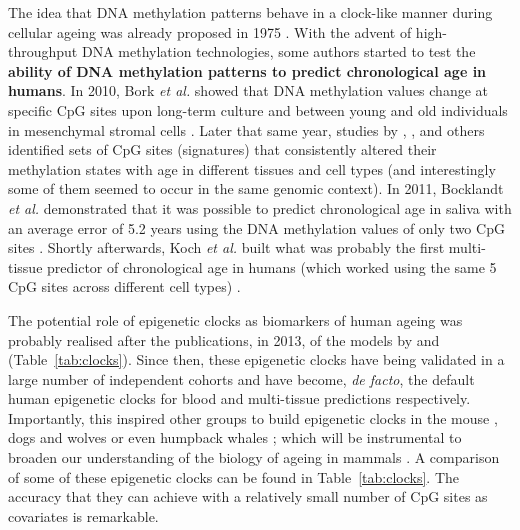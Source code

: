 \bigskip

The idea that DNA methylation patterns behave in a clock-like manner during cellular ageing was already proposed in 1975 \citep{Holliday1975}. With the advent of high-throughput DNA methylation technologies, some authors started to test the \textbf{ability of DNA methylation patterns to predict chronological age in humans}. In 2010, Bork \textit{et al.} showed that DNA methylation values change at specific CpG sites upon long-term culture and between young and old individuals in mesenchymal stromal cells \citep{Bork2010}. Later that same year, studies by \citet{Teschendorff2010}, \citet{Rakyan2010}, \citet{Gronniger2010} and others identified sets of CpG sites (signatures) that consistently altered their methylation states with age in different tissues and cell types (and interestingly some of them seemed to occur in the same genomic context). In 2011, Bocklandt \textit{et al.} demonstrated that it was possible to predict chronological age in saliva with an average error of 5.2 years using the DNA methylation values of only two CpG sites \citep{Bocklandt2011}. Shortly afterwards, Koch \textit{et al.} built what was probably the first multi-tissue predictor of chronological age in humans (which worked using the same 5 CpG sites across different cell types) \citep{Koch2011}. 

\bigskip

The potential role of epigenetic clocks as biomarkers of human ageing was probably realised after the publications, in 2013, of the models by \citet{Hannum2013} and \citet{Horvath2013} (Table~\ref{tab:clocks}). Since then, these epigenetic clocks have being validated in a large number of independent cohorts and have become, \textit{de facto}, the default human epigenetic clocks for blood and multi-tissue predictions respectively. Importantly, this inspired other groups to build epigenetic clocks in the mouse \citep{Wang2017,Stubbs2017,Petkovich2017,Thompson2018,Meer2018}, dogs and wolves \citep{Thompson2017} or even humpback whales \citep{Polanowski2014}; which will be instrumental to broaden our understanding of the biology of ageing in mammals \citep{Stubbs2017}. A comparison of some of these epigenetic clocks can be found in Table~\ref{tab:clocks}. The accuracy that they can achieve with a relatively small number of CpG sites as covariates is remarkable.

\bigskip

